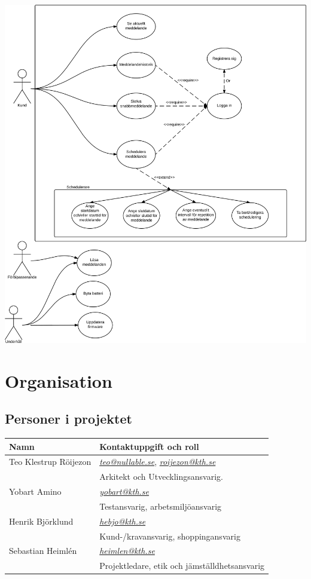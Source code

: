 \documentclass[11pt]{article}
\begin{document}
\begin{center}
\includegraphics[width=.9\linewidth]{../Arkitektur/PrimarUC.png}
\end{center}

\section{Organisation}
\label{sec:org2a84e43}
\subsection{Personer i projektet}
\label{sec:org47e30ad}
\begin{center}
\begin{tabular}{ll}
\textbf{Namn} & \textbf{Kontaktuppgift och roll}\\
\hline
Teo Klestrup Röijezon & \href{mailto:teo@nullable.se}{\emph{teo@nullable.se}}, \href{mailto:roijezon@kth.se}{\emph{roijezon@kth.se}}\\
 & Arkitekt och Utvecklingsansvarig.\\
Yobart Amino & \href{mailto:yobart@kth.se}{\emph{yobart@kth.se}}\\
 & Testansvarig, arbetsmiljöansvarig\\
Henrik Björklund & \href{mailto:hebjo@kth.se}{\emph{hebjo@kth.se}}\\
 & Kund-/kravansvarig, shoppingansvarig\\
Sebastian Heimlén & \href{mailto:heimlen@kth.se}{\emph{heimlen@kth.se}}\\
 & Projektledare, etik och jämställdhetsansvarig\\
\end{tabular}
\end{center}
\end{document}
